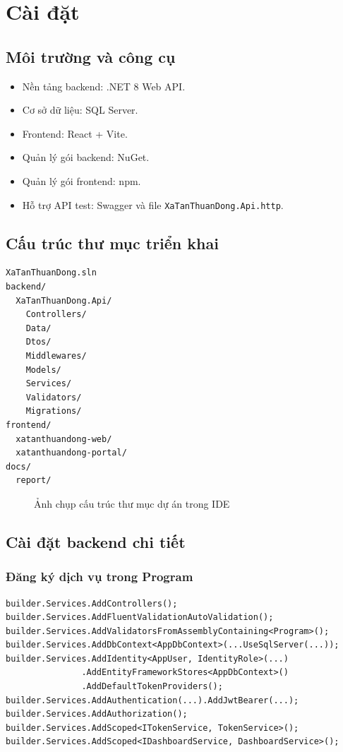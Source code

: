 \documentclass[12pt,a4paper]{article}
\newcommand{\figureplaceholder}[2]{
  \begin{figure}[H]
    \centering
    \fbox{
      \begin{minipage}[c][5.2cm][c]{0.9\linewidth}
        \centering
        \textbf{CHO CHEN HINH MINH HOA}
      \end{minipage}
    }
    \caption{#1}
    \label{#2}
  \end{figure}
}
\begin{document}
\newpage

\section{Cài đặt}

\subsection{Môi trường và công cụ}
\begin{itemize}[leftmargin=1.1cm]
  \item Nền tảng backend: .NET 8 Web API.
  \item Cơ sở dữ liệu: SQL Server.
  \item Frontend: React + Vite.
  \item Quản lý gói backend: NuGet.
  \item Quản lý gói frontend: npm.
  \item Hỗ trợ API test: Swagger và file \texttt{XaTanThuanDong.Api.http}.
\end{itemize}

\subsection{Cấu trúc thư mục triển khai}
\begin{lstlisting}[style=appcode]
XaTanThuanDong.sln
backend/
  XaTanThuanDong.Api/
    Controllers/
    Data/
    Dtos/
    Middlewares/
    Models/
    Services/
    Validators/
    Migrations/
frontend/
  xatanthuandong-web/
  xatanthuandong-portal/
docs/
  report/
\end{lstlisting}

\figureplaceholder{Ảnh chụp cấu trúc thư mục dự án trong IDE}{fig:project-structure}

\subsection{Cài đặt backend chi tiết}

\subsubsection{Đăng ký dịch vụ trong Program}
\begin{lstlisting}[style=appcode]
builder.Services.AddControllers();
builder.Services.AddFluentValidationAutoValidation();
builder.Services.AddValidatorsFromAssemblyContaining<Program>();
builder.Services.AddDbContext<AppDbContext>(...UseSqlServer(...));
builder.Services.AddIdentity<AppUser, IdentityRole>(...)
               .AddEntityFrameworkStores<AppDbContext>()
               .AddDefaultTokenProviders();
builder.Services.AddAuthentication(...).AddJwtBearer(...);
builder.Services.AddAuthorization();
builder.Services.AddScoped<ITokenService, TokenService>();
builder.Services.AddScoped<IDashboardService, DashboardService>();
\end{lstlisting}
\end{document}
